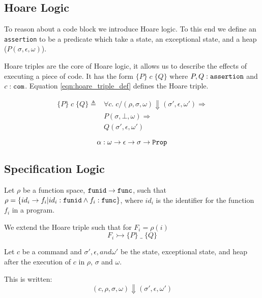 \subsection{Hoare Logic}
To reason about a code block we introduce Hoare logic. To this end we define an \verb|assertion| to be a predicate which take a state, an exceptional state, and a heap ($P(\sigma,\epsilon,\omega)$).

Hoare triples are the core of Hoare logic, it allows us to describe the effects of executing a piece of code. It has the form $\{P\}\;c\;\{Q\}$ where $P,Q : \verb|assertion|$ and $c : \verb|com|$.
Equation \ref{eqn:hoare_triple_def} defines the Hoare triple.

\begin{equation}\label{eqn:hoare_triple_def}
\begin{split}
\{P\}\;c\;\{Q\} \triangleq
& \forall c.\; c / (\rho,\sigma,\omega) \Downarrow (\sigma', \epsilon, \omega') \Rightarrow\\
& P(\sigma,\bot,\omega) \Rightarrow\\
& Q(\sigma',\epsilon,\omega')
\end{split}
\end{equation}

\begin{equation}\label{eqn:alpha-type}
\alpha: \omega \rightarrow \epsilon \rightarrow \sigma \rightarrow \verb|Prop|
\end{equation}


\subsection{Specification Logic}
Let $\rho$ be a function space, 
$\verb|funid| \rightarrow \verb|func|$, 
such that 
$\rho = \{ id_i \rightarrow f_i | id_i : \verb|funid| \wedge f_i:\verb|func| \}$, 
where $id_i$ is the identifier for the function $f_i$ in a program.

We extend the Hoare triple such that for $F_i = \rho(i)$
\begin{equation}
F_i \rightarrowtail \{P\}\;\_\;\{Q\}
\end{equation}

\begin{notation}
Let $c$ be a command and $\sigma',\epsilon, and \omega'$ be the state, exceptional state, and heap after the execution of $c$ in $\rho$, $\sigma$ and $\omega$.

This is written:
\begin{equation}
(c,\rho,\sigma,\omega) \Downarrow (\sigma',\epsilon,\omega')
\end{equation}
\end{notation}

